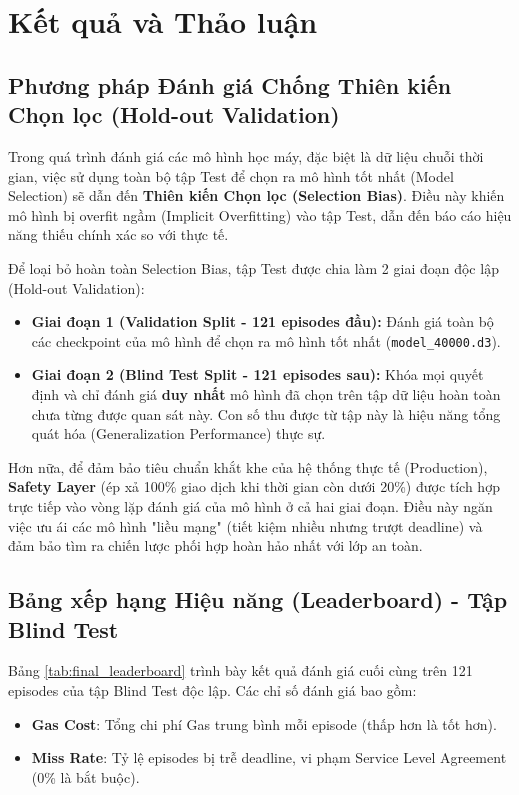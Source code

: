 \section{Kết quả và Thảo luận}

\subsection{Phương pháp Đánh giá Chống Thiên kiến Chọn lọc (Hold-out Validation)}

Trong quá trình đánh giá các mô hình học máy, đặc biệt là dữ liệu chuỗi thời gian, việc sử dụng toàn bộ tập Test để chọn ra mô hình tốt nhất (Model Selection) sẽ dẫn đến \textbf{Thiên kiến Chọn lọc (Selection Bias)}. Điều này khiến mô hình bị overfit ngầm (Implicit Overfitting) vào tập Test, dẫn đến báo cáo hiệu năng thiếu chính xác so với thực tế.

Để loại bỏ hoàn toàn Selection Bias, tập Test được chia làm 2 giai đoạn độc lập (Hold-out Validation):
\begin{itemize}
    \item \textbf{Giai đoạn 1 (Validation Split - 121 episodes đầu):} Đánh giá toàn bộ các checkpoint của mô hình để chọn ra mô hình tốt nhất (\texttt{model\_40000.d3}).
    \item \textbf{Giai đoạn 2 (Blind Test Split - 121 episodes sau):} Khóa mọi quyết định và chỉ đánh giá \textbf{duy nhất} mô hình đã chọn trên tập dữ liệu hoàn toàn chưa từng được quan sát này. Con số thu được từ tập này là hiệu năng tổng quát hóa (Generalization Performance) thực sự.
\end{itemize}

Hơn nữa, để đảm bảo tiêu chuẩn khắt khe của hệ thống thực tế (Production), \textbf{Safety Layer} (ép xả 100\% giao dịch khi thời gian còn dưới 20\%) được tích hợp trực tiếp vào vòng lặp đánh giá của mô hình ở cả hai giai đoạn. Điều này ngăn việc ưu ái các mô hình "liều mạng" (tiết kiệm nhiều nhưng trượt deadline) và đảm bảo tìm ra chiến lược phối hợp hoàn hảo nhất với lớp an toàn.

\subsection{Bảng xếp hạng Hiệu năng (Leaderboard) - Tập Blind Test}

Bảng \ref{tab:final_leaderboard} trình bày kết quả đánh giá cuối cùng trên 121 episodes của tập Blind Test độc lập. Các chỉ số đánh giá bao gồm:
\begin{itemize}
    \item \textbf{Gas Cost}: Tổng chi phí Gas trung bình mỗi episode (thấp hơn là tốt hơn).
    \item \textbf{Miss Rate}: Tỷ lệ episodes bị trễ deadline, vi phạm Service Level Agreement (0\% là bắt buộc).
\end{itemize}

